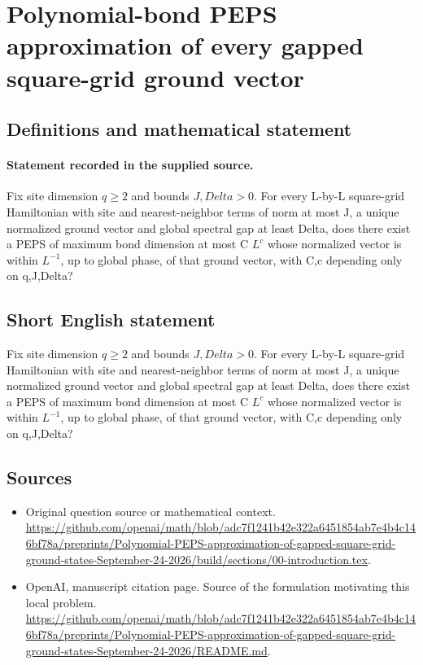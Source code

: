 \documentclass[11pt]{article}
\begin{document}
\section*{Polynomial-bond PEPS approximation of every gapped square-grid ground vector}\label{30007224}
\subsection{Definitions and mathematical statement}
\paragraph{Statement recorded in the supplied source.}
Fix site dimension $q\geq 2$ and bounds $J,Delta>0$. For every L-by-L square-grid Hamiltonian with site and nearest-neighbor terms of norm at most J, a unique normalized ground vector and global spectral gap at least Delta, does there exist a PEPS of maximum bond dimension at most C $L^c$ whose normalized vector is within $L^{-1}$, up to global phase, of that ground vector, with C,c depending only on q,J,Delta?
\subsection{Short English statement}
Fix site dimension $q\geq 2$ and bounds $J,Delta>0$. For every L-by-L square-grid Hamiltonian with site and nearest-neighbor terms of norm at most J, a unique normalized ground vector and global spectral gap at least Delta, does there exist a PEPS of maximum bond dimension at most C $L^c$ whose normalized vector is within $L^{-1}$, up to global phase, of that ground vector, with C,c depending only on q,J,Delta?
\subsection{Sources}
\begin{itemize}
\item[S1] Original question source or mathematical context.
\url{https://github.com/openai/math/blob/adc7f1241b42e322a6451854ab7e4b4c146bf78a/preprints/Polynomial-PEPS-approximation-of-gapped-square-grid-ground-states-September-24-2026/build/sections/00-introduction.tex}.
\item[S2] OpenAI, manuscript citation page. Source of the formulation motivating this local problem.
\url{https://github.com/openai/math/blob/adc7f1241b42e322a6451854ab7e4b4c146bf78a/preprints/Polynomial-PEPS-approximation-of-gapped-square-grid-ground-states-September-24-2026/README.md}.
\end{itemize}
\end{document}
